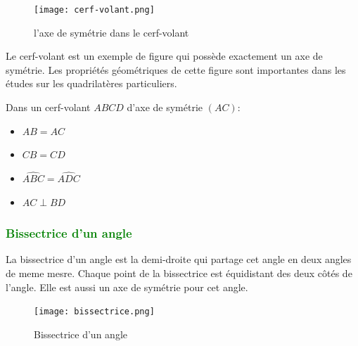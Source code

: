 \documentclass{article}
\begin{document}
\begin{figure}[H]
    \centering
    \texttt{[image: cerf-volant.png]}
    \caption{l'axe de symétrie dans le cerf-volant}
    \label{fig:enter-label}
\end{figure}

\vspace{0.2cm}

Le cerf-volant est un exemple de figure qui possède exactement un axe de symétrie. Les propriétés géométriques de cette figure sont importantes dans les études sur les quadrilatères particuliers.

\vspace{0.2cm}

\begin{tcolorbox}[colback=red!10!white, colframe=red!75!black, title=\textcolor{white}{Définition : Bissectrice}, sharp corners=south]
Dans un cerf-volant \( ABCD \) d'axe de symétrie \( (AC) \):
\begin{itemize}
    \item \( AB = AC \)
    \item \( CB = CD \)
    \item \( \widehat{ABC} = \widehat{ADC} \)
    \item \( AC \perp BD \)
\end{itemize}
\end{tcolorbox}

\subsubsection{\textcolor{green}{Bissectrice d'un angle}}

\vspace{0.2cm}

\begin{tcolorbox}[colback=red!10!white, colframe=red!75!black, title=\textcolor{white}{Définition : Bissectrice}, sharp corners=south]
    La bissectrice d'un angle est la demi-droite qui partage cet angle en deux angles de meme mesre. Chaque point de la bissectrice est équidistant des deux côtés de l'angle. Elle est aussi un axe de symétrie pour cet angle.
\end{tcolorbox}

\vspace{0.2cm}

\begin{figure}[H]
    \centering
    \texttt{[image: bissectrice.png]}
    \caption{Bissectrice d'un angle}
    \label{fig:enter-label}
\end{figure}
\end{document}
